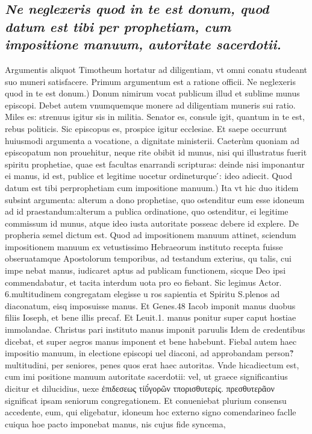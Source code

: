 \documentclass{article}
\begin{document}
\begin{pages}
\subsection*{\textit{Ne neglexeris quod in te est donum, quod datum est tibi per prophetiam, cum impositione manuum, autoritate sacerdotii. }}\pstart Argumentis aliquot Timotheum hortatur ad diligentiam, vt omni conatu studeant suo muneri satisfacere. Primum argumentum est a ratione officii.  \pend\pstart Ne neglexeris quod in te est donum.) Donum nimirum vocat publicum illud et sublime munus episcopi. Debet autem vnumquemque monere ad diligentiam muneris sui ratio. Miles es: strenuus igitur sis in militia. Senator es, consule igit, quantum in te est, rebus politicis. Sic episcopus es, prospice igitur ecclesiae. Et saepe occurrunt huiusmodi argumenta a vocatione, a dignitate ministerii. Caeterùm quoniam ad episcopatum non prouehitur, neque rite obibit id munus, nisi qui illustratus fuerit spiritu prophetiae, quae est facultas enarrandi scripturas: deinde nisi imponantur ei manus, id est, publice et legitime uocetur ordineturque ́: ideo adiecit.  \pend\pstart Quod datum est tibi perprophetiam cum impositione manuum.) Ita vt hic duo itidem subsint argumenta: alterum a dono prophetiae, quo ostenditur eum esse idoneum ad id praestandum:alterum a publica ordinatione, quo ostenditur, ei legitime commissum id munus, atque ideo iusta autoritate posseac debere id explere. De propheria semel dictum est. Quod ad impositionem manuum attinet, sciendum impositionem manuum ex vetustissimo Hebraeorum instituto recepta fuisse obseruatamque Apostolorum temporibus, ad testandum exterius, qu talis, cui impe nebat manus, iudicaret aptus ad publicam functionem, sicque Deo ipsi commendabatur, et tacita interdum uota pro eo fiebant. Sic legimus Actor. 6.multitudinem congregatam elegisse u ros sapientia et Spiritu S.plenos ad diaconatum, eisq imposuisse manus. Et Genes.48 Iacob imponit manus duobus filiis Ioseph, et bene illis precaf. Et Leuit.1. manus ponitur super caput hostiae immolandae. Christus pari instituto manus imponit paruulis Idem de credentibus dicebat, et super aegros manus imponent et bene habebunt. Fiebal autem haec impositio manuum, in electione episcopi uel diaconi, ad approbandam person?̃ multitudini, per seniores, penes quos erat haec autoritas. Vnde hicadiectum est, cum imi positione manuum autoritate sacerdotii: vel, ut graece significantius dicitur et dilucidius, uexe ἐπιδεσεως τίῦ́γορῶν τπορισθυτερίς. πρεσθυτερᾶον significat ipsam seniorum congregationem. Et conueniebat plurium consensu accedente, eum, qui eligebatur, idoneum hoc externo signo comendarineo faclle cuiqua hoe pacto imponebat manus, nis cujus fide syncema,  \pend

\end{pages}
\end{document}
